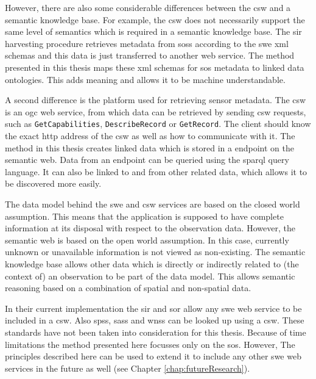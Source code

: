 However, there are also some considerable differences between the \ac{csw} and a semantic knowledge base. For example, the \ac{csw} does not necessarily support the same level of semantics which is required in a semantic knowledge base. The \ac{sir} harvesting procedure retrieves metadata from \aclp{sos} according to the \ac{swe} \ac{xml} schemas and this data is just transferred to another web service. The method presented in this thesis maps these \ac{xml} schemas for \ac{sos} metadata to linked data ontologies. This adds meaning and allows it to be machine understandable.

A second difference is the platform used for retrieving sensor metadata. The \ac{csw} is an \ac{ogc} web service, from which data can be retrieved by sending \ac{csw} requests, such as \texttt{GetCapabilities}, \texttt{DescribeRecord} or \texttt{GetRecord}. The client should know the exact \ac{http} address of the \ac{csw} as well as how to communicate with it. The method in this thesis creates linked data which is stored in a endpoint on the semantic web. Data from an endpoint can be queried using the \ac{sparql} query language. It can also be linked to and from other related data, which allows it to be discovered more easily.    

The data model behind the \ac{swe} and \ac{csw} services are based on the closed world assumption. This means that the application is supposed to have complete information at its disposal with respect to the observation data. However, the semantic web is based on the open world assumption. In this case, currently unknown or unavailable information is not viewed as non-existing. The semantic knowledge base allows other data which is directly or indirectly related to (the context of) an observation to be part of the data model. This allows semantic reasoning based on a combination of spatial and non-spatial data.       

In their current implementation the \ac{sir} and \ac{sor} allow any \ac{swe} web service to be included in a \ac{csw}. Also \aclp{sps}, \aclp{sas} and \aclp{wns} can be looked up using a \ac{csw}. These standards have not been taken into consideration for this thesis. Because of time limitations the method presented here focusses only on the \ac{sos}. However, The principles described here can be used to extend it to include any other \ac{swe} web services in the future as well (see Chapter \ref{chap:futureResearch}).        

